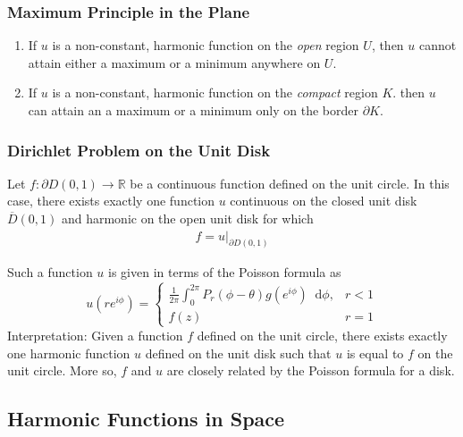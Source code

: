 \documentclass[11pt, a4paper]{article}
\newcommand{\diff}{\mathop{}\!\mathrm{d}} %
\newcommand{\R}{\mathbb{R}} %
\begin{document}
\subsubsection{Maximum Principle in the Plane}
\begin{enumerate}
	\item If $ u $ is a non-constant, harmonic function on the \textit{open} region $ U $, then $ u $ cannot attain either a maximum or a minimum anywhere on $ U $. 
	
	\item If $ u $ is a non-constant, harmonic function on the \textit{compact} region $ K $. then $ u $ can attain an a maximum or a minimum only on the border $ \partial K $.
\end{enumerate}



\subsubsection{Dirichlet Problem on the Unit Disk}
Let $ f : \partial D(0, 1) \to \R$ be a continuous function defined on the unit circle. In this case, there exists exactly one function $ u $ continuous on the closed unit disk $ \overline{D}(0, 1) $ and harmonic on the open unit disk for which
\begin{align*}
	f = u \big |_{\partial D(0, 1)}
\end{align*}

Such a function $ u $ is given in terms of the Poisson formula as
\[
	u(re^{i\phi}) = 
	\begin{cases}
		\displaystyle{\frac{1}{2\pi}\int_{0}^{2\pi}P_r(\phi - \theta) g(e^{i\phi})\diff \phi}, & r < 1\\[2.0mm]
		f(z) & r = 1
	\end{cases}	
\]
Interpretation: Given a function $ f $ defined on the unit circle, there exists exactly one harmonic function $ u $ defined on the unit disk such that $ u $ is equal to $ f $ on the unit circle. More so, $ f $ and $ u $ are closely related by the Poisson formula for a disk.
 

\subsection{Harmonic Functions in Space}
\end{document}
